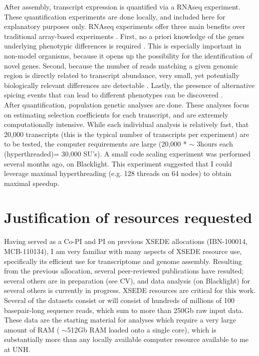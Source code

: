 \documentclass[10.5pt]{article}
\begin{document}
{\noindent
After assembly, transcript expression is quantified via a RNAseq experiment. These quantification experiments are done locally, and included here for explanatory purposes only. RNAseq experiments offer three main benefits over traditional array-based experiments \citep{tHoen:2008hn}. First, no a priori knowledge of the genes underlying phenotypic differences is required \citep{Gilad:2009km}.  This is especially important in non-model organisms, because it opens up the possibility for the identification of novel genes. Second, because the number of reads matching a given genomic region is directly related to transcript abundance, very small, yet potentially biologically relevant differences are detectable \citep{Mortazavi:2008jj}.  Lastly, the presence of alternative spicing events that can lead to different phenotypes can be discovered \citep{Sultan:2008jh}.  \\

\noindent
After quantification, population genetic analyses are done. These analyses focus on estimating selection coefficients for each transcript, and are extremely computationally intensive. While each individual analysis is relatively fast, that 20,000 transcripts (this is the typical number of transcripts per experiment) are to be tested, the computer requirements are large (20,000 * $\sim$ 3hours each (hyperthreaded)= 30,000 SU's). A small code scaling experiment was performed several months ago, on Blacklight. This experiment suggested that I could leverage maximal hyperthreading (e.g. 128 threads on 64 nodes) to obtain maximal speedup.  \\

\section*{Justification of resources requested}
Having served as a Co-PI and PI on previous XSEDE allocations (IBN-100014, MCB-110134), I am very familiar with many aspects of XSEDE resource use, specifically its efficient use for transcriptome and genome assembly.  Resulting from the previous allocation, several peer-reviewed publications have resulted; several others are in preparation (see CV), and data analysis (on Blacklight) for several others is currently in progress.  XSEDE resources are critical for this work.  Several of the datasets consist or will consist of hundreds of millions of 100 basepair-long sequence reads, which sum to more than 250Gb raw input data. These data are the starting material for analyses which require a very large amount of RAM ( $\sim$512Gb RAM loaded onto a single core), which is substantially more than any locally available computer resource available to me at UNH.  \\


}
\end{document}

